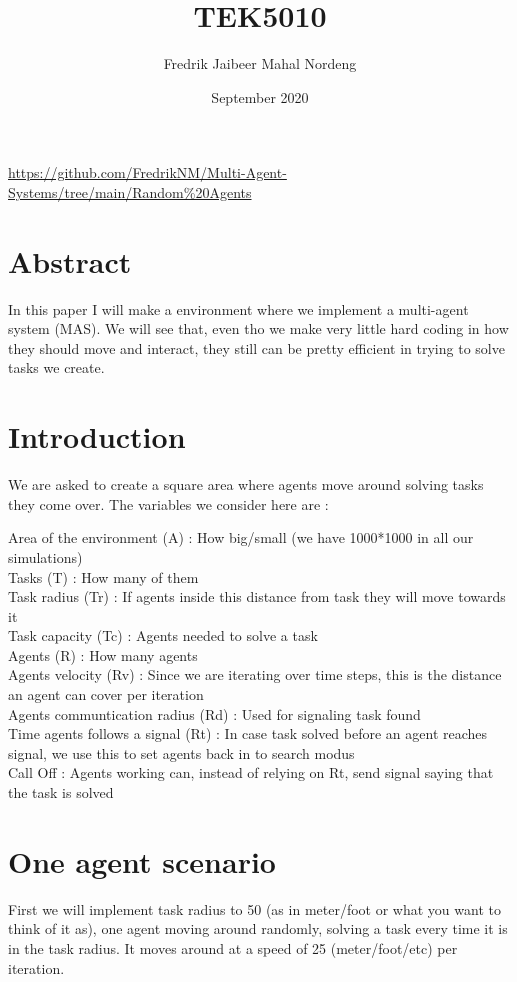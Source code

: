 \documentclass[a4paper]{article}
\title{TEK5010}
\author{Fredrik Jaibeer Mahal Nordeng}
\date{September 2020}
\begin{document}
\maketitle
\url{https://github.com/FredrikNM/Multi-Agent-Systems/tree/main/Random%20Agents}

\section{Abstract}

In this paper I will make a environment where we implement a multi-agent system (MAS). We will see that, even tho we make very little hard coding in how they should move and interact, they still can be pretty efficient in trying to solve tasks we create.

\section{Introduction}

We are asked to create a square area where agents move around solving tasks they come over. The variables we consider here are :

Area of the environment (A) : How big/small (we have 1000*1000 in all our simulations) \\
Tasks (T) : How many of them \\
Task radius (Tr) : If agents inside this distance from task they will move towards it \\
Task capacity (Tc) : Agents needed to solve a task \\
Agents (R) : How many agents \\
Agents velocity (Rv) : Since we are iterating over time steps, this is the distance an agent can cover per iteration \\
Agents communtication radius (Rd) : Used for signaling task found \\
Time agents follows a signal (Rt) : In case task solved before an agent reaches signal, we use this to set agents back in to search modus \\
Call Off : Agents working can, instead of relying on Rt, send signal saying that the task is solved 

\section{One agent scenario}



First we will implement task radius to 50 (as in meter/foot or what you want to think of it as), one agent moving around randomly, solving a task every time it is in the task radius. It moves around at a speed of 25 (meter/foot/etc) per iteration. 
\end{document}

